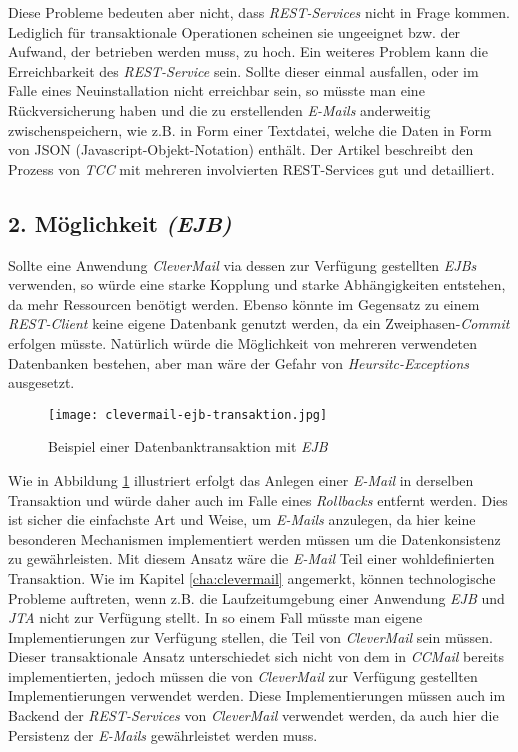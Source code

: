 \newline
\newline
Diese Probleme bedeuten aber nicht, dass \emph{REST-Services} nicht in Frage kommen. Lediglich für transaktionale Operationen scheinen sie ungeeignet bzw. der Aufwand, der betrieben werden muss, zu hoch. Ein weiteres Problem kann die Erreichbarkeit des \emph{REST-Service} sein. Sollte dieser einmal ausfallen, oder im Falle eines Neuinstallation nicht erreichbar sein, so müsste man eine Rückversicherung haben und die zu erstellenden \emph{E-Mails} anderweitig zwischenspeichern, wie z.B. in Form einer Textdatei, welche die Daten in Form von JSON (Javascript-Objekt-Notation) enthält.
\newline
\newline
Der Artikel \cite{atomikosTcc} beschreibt den Prozess von \emph{TCC} mit mehreren involvierten REST-Services gut und detailliert.

\subsection{2. Möglichkeit \emph{(EJB)}}
Sollte eine Anwendung \emph{CleverMail} via dessen zur Verfügung gestellten \emph{EJBs} verwenden, so würde eine starke Kopplung und starke Abhängigkeiten entstehen, da mehr Ressourcen benötigt werden. Ebenso könnte im Gegensatz zu einem \emph{REST-Client} keine eigene Datenbank genutzt werden, da ein Zweiphasen-\emph{Commit} erfolgen müsste. Natürlich würde die Möglichkeit von mehreren verwendeten Datenbanken bestehen, aber man wäre der Gefahr von \emph{Heursitc-Exceptions} ausgesetzt.
\newpage
\begin{figure}[h]
\centering
\texttt{[image: clevermail-ejb-transaktion.jpg]} %
\caption{Beispiel einer Datenbanktransaktion mit \emph{EJB}}
\label{fig:clevermail-rest-tcc}
\end{figure}
Wie in Abbildung \ref{fig:clevermail-rest-tcc} illustriert erfolgt das Anlegen einer \emph{E-Mail} in derselben Transaktion und würde daher auch im Falle eines \emph{Rollbacks} entfernt werden. Dies ist sicher die einfachste Art und Weise, um \emph{E-Mails} anzulegen, da hier keine besonderen Mechanismen implementiert werden müssen um die Datenkonsistenz zu gewährleisten. Mit diesem Ansatz wäre die \emph{E-Mail} Teil einer wohldefinierten Transaktion.
\newline
\newline
Wie im Kapitel \ref{cha:clevermail} angemerkt, können technologische Probleme auftreten, wenn z.B. die Laufzeitumgebung einer Anwendung \emph{EJB} und \emph{JTA} nicht zur Verfügung stellt. In so einem Fall müsste man eigene Implementierungen zur Verfügung stellen, die Teil von \emph{CleverMail} sein müssen.
\newline
\newline
Dieser transaktionale Ansatz unterschiedet sich nicht von dem in \emph{CCMail} bereits implementierten, jedoch müssen die von \emph{CleverMail} zur Verfügung gestellten Implementierungen verwendet werden. Diese Implementierungen müssen auch im Backend der \emph{REST-Services} von \emph{CleverMail} verwendet werden, da auch hier die Persistenz der \emph{E-Mails} gewährleistet werden muss.
 
